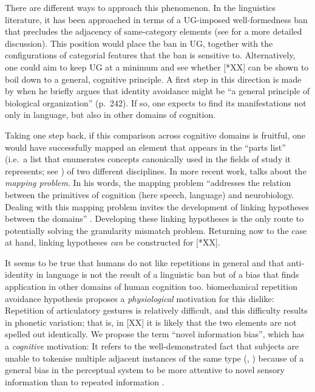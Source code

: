 \documentclass[output=paper]{langsci/langscibook}
\begin{document}
There are different ways to approach this phenomenon. In the linguistics
literature, it has been approached in terms of a UG-imposed well-formedness ban
that precludes the adjacency of same-category elements (see
\citealt{Richards2010} for a more detailed discussion). This position would
place the ban in \gls{UG}, together with the configurations of categorial
features that the ban is sensitive to. Alternatively, one could aim to keep
\gls{UG} at a minimum and see whether [*XX] can be shown to boil down to a
general, cognitive principle. A first step in this direction is made by
\citet{vanRiemsdijk2008} when he briefly argues that identity avoidance might
be \enquote{a general principle of biological organization} (p.\ 242). If so,
one expects to find its manifestations not only in language, but also in other
domains of cognition.

Taking one step back, if this comparison across cognitive domains is fruitful,
one would have successfully mapped an element that appears in the
\enquote{parts list} (i.e.\ a list that enumerates concepts canonically used in
the fields of study it represents; see \citealt{PoeEmb2005}) of two different
disciplines.  In more recent work, \citet{Poeppel2012} talks about the
\emph{mapping problem}. In his words, the mapping problem “addresses the
relation between the primitives of cognition (here speech, language) and
neurobiology.  Dealing with this mapping problem invites the development of
linking hypotheses between the domains” \citep[34]{Poeppel2012}. Developing
these linking hypotheses is the only route to potentially solving the
granularity mismatch problem. Returning now to the case at hand, linking
hypotheses \emph{can} be constructed for [*XX].

It seems to be true that humans do not like repetitions in general and that
anti-identity in language is not the result of a linguistic ban but of a bias
that finds application in other domains of human cognition too.
 biomechanical repetition avoidance hypothesis proposes a
\emph{physiological} motivation for this dislike: Repetition of articulatory
gestures is relatively difficult, and this difficulty results in phonetic
variation; that is, in [XX] it is likely that the two elements are not spelled
out identically. We propose the term \enquote{novel information bias}, which has a
\emph{cognitive} motivation: It refers to the well-demonstrated fact that
subjects are unable to tokenise multiple adjacent instances of the same type
(\citealt{TreKan1998}, \citealt{Walter2007}) because of a general bias in the
perceptual system to be more attentive to novel sensory information than to
repeated information \citep{Leivada2017}.
\end{document}
